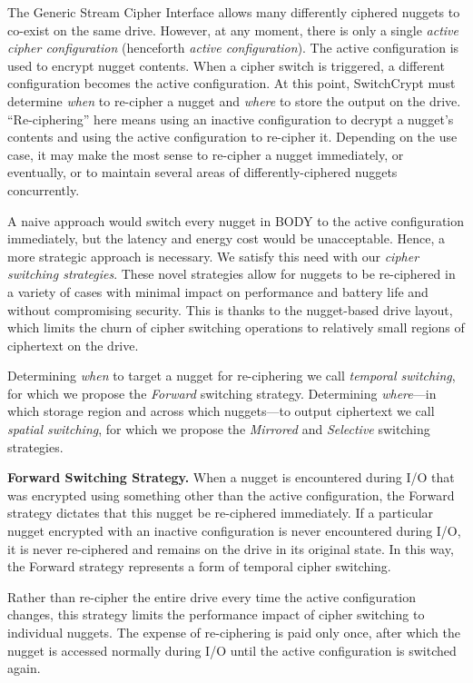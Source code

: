 The Generic Stream Cipher Interface allows many differently ciphered nuggets to
co-exist on the same drive. However, at any moment, there is only a single
\emph{active cipher configuration} (henceforth \emph{active configuration}). The
active configuration is used to encrypt nugget contents. When a cipher switch is
triggered, a different configuration becomes the active configuration. At this
point, SwitchCrypt must determine \emph{when} to re-cipher a nugget and
\emph{where} to store the output on the drive. ``Re-ciphering'' here means using
an inactive configuration to decrypt a nugget's contents and using the active
configuration to re-cipher it. Depending on the use case, it may make the most
sense to re-cipher a nugget immediately, or eventually, or to maintain several
areas of differently-ciphered nuggets concurrently.

A naive approach would switch every nugget in BODY to the active configuration
immediately, but the latency and energy cost would be unacceptable. Hence, a
more strategic approach is necessary. We satisfy this need with our \emph{cipher
switching strategies}. These novel strategies allow for nuggets to be
re-ciphered in a variety of cases with minimal impact on performance and battery
life and without compromising security. This is thanks to the nugget-based drive
layout, which limits the churn of cipher switching operations to relatively
small regions of ciphertext on the drive.

Determining \emph{when} to target a nugget for re-ciphering we call
\emph{temporal switching}, for which we propose the \emph{Forward} switching
strategy. Determining \emph{where}---in which storage region and across which
nuggets---to output ciphertext we call \emph{spatial switching}, for which we
propose the \emph{Mirrored} and \emph{Selective} switching strategies.

\textbf{Forward Switching Strategy.} When a nugget is encountered during I/O
that was encrypted using something other than the active configuration, the
Forward strategy dictates that this nugget be re-ciphered immediately. If a
particular nugget encrypted with an inactive configuration is never encountered
during I/O, it is never re-ciphered and remains on the drive in its original
state. In this way, the Forward strategy represents a form of temporal cipher
switching.

Rather than re-cipher the entire drive every time the active configuration
changes, this strategy limits the performance impact of cipher switching to
individual nuggets. The expense of re-ciphering is paid only once, after which
the nugget is accessed normally during I/O until the active configuration is
switched again.

